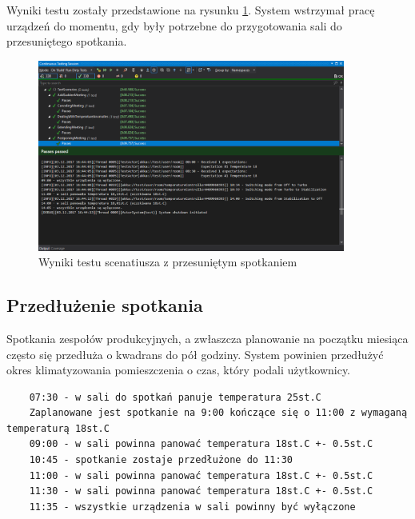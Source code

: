 Wyniki testu zostały przedstawione na rysunku \ref{fig:PostponedMeeting}.
System wstrzymał pracę urządzeń do momentu, gdy były potrzebne do przygotowania sali do przesuniętego spotkania.
\begin{figure}[p]
    \centering
    \includegraphics[width=0.90\textwidth]{./screenshots/PostponedMeeting.png}
    \caption{Wyniki testu scenatiusza z przesuniętym spotkaniem}
    \label{fig:PostponedMeeting}    
\end{figure}

\subsection{Przedłużenie spotkania}
Spotkania zespołów produkcyjnych, a zwłaszcza planowanie na początku miesiąca często się przedłuża o kwadrans do pół godziny. System powinien przedłużyć okres klimatyzowania pomieszczenia o czas, który podali użytkownicy.
\begin{lstlisting}
    07:30 - w sali do spotkań panuje temperatura 25st.C
    Zaplanowane jest spotkanie na 9:00 kończące się o 11:00 z wymaganą temperaturą 18st.C
    09:00 - w sali powinna panować temperatura 18st.C +- 0.5st.C
    10:45 - spotkanie zostaje przedłużone do 11:30
    11:00 - w sali powinna panować temperatura 18st.C +- 0.5st.C
    11:30 - w sali powinna panować temperatura 18st.C +- 0.5st.C
    11:35 - wszystkie urządzenia w sali powinny być wyłączone
\end{lstlisting}

